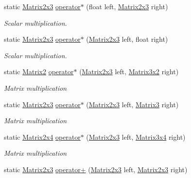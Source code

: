 \begin{DoxyCompactItemize}
static \hyperlink{struct_open_t_k_1_1_matrix2x3}{Matrix2x3} \hyperlink{struct_open_t_k_1_1_matrix2x3_a84afd0c811f503374c81e44624cfeb63}{operator$\ast$} (float left, \hyperlink{struct_open_t_k_1_1_matrix2x3}{Matrix2x3} right)
\begin{DoxyCompactList}\small\item\em Scalar multiplication. \end{DoxyCompactList}\item 
static \hyperlink{struct_open_t_k_1_1_matrix2x3}{Matrix2x3} \hyperlink{struct_open_t_k_1_1_matrix2x3_a46fd7c38596f36c2860169e295a00d28}{operator$\ast$} (\hyperlink{struct_open_t_k_1_1_matrix2x3}{Matrix2x3} left, float right)
\begin{DoxyCompactList}\small\item\em Scalar multiplication. \end{DoxyCompactList}\item 
static \hyperlink{struct_open_t_k_1_1_matrix2}{Matrix2} \hyperlink{struct_open_t_k_1_1_matrix2x3_aa572012fd72133ad3fa3be8e8f78bfee}{operator$\ast$} (\hyperlink{struct_open_t_k_1_1_matrix2x3}{Matrix2x3} left, \hyperlink{struct_open_t_k_1_1_matrix3x2}{Matrix3x2} right)
\begin{DoxyCompactList}\small\item\em Matrix multiplication \end{DoxyCompactList}\item 
static \hyperlink{struct_open_t_k_1_1_matrix2x3}{Matrix2x3} \hyperlink{struct_open_t_k_1_1_matrix2x3_a14ce1aff6a932c3629649e543c47ca2a}{operator$\ast$} (\hyperlink{struct_open_t_k_1_1_matrix2x3}{Matrix2x3} left, \hyperlink{struct_open_t_k_1_1_matrix3}{Matrix3} right)
\begin{DoxyCompactList}\small\item\em Matrix multiplication \end{DoxyCompactList}\item 
static \hyperlink{struct_open_t_k_1_1_matrix2x4}{Matrix2x4} \hyperlink{struct_open_t_k_1_1_matrix2x3_a454b5cd6203618ff4194f812219accd3}{operator$\ast$} (\hyperlink{struct_open_t_k_1_1_matrix2x3}{Matrix2x3} left, \hyperlink{struct_open_t_k_1_1_matrix3x4}{Matrix3x4} right)
\begin{DoxyCompactList}\small\item\em Matrix multiplication \end{DoxyCompactList}\item 
static \hyperlink{struct_open_t_k_1_1_matrix2x3}{Matrix2x3} \hyperlink{struct_open_t_k_1_1_matrix2x3_aa5a3bab800bab69967bbd0b6a3d0a09a}{operator+} (\hyperlink{struct_open_t_k_1_1_matrix2x3}{Matrix2x3} left, \hyperlink{struct_open_t_k_1_1_matrix2x3}{Matrix2x3} right)

\end{DoxyCompactItemize}
